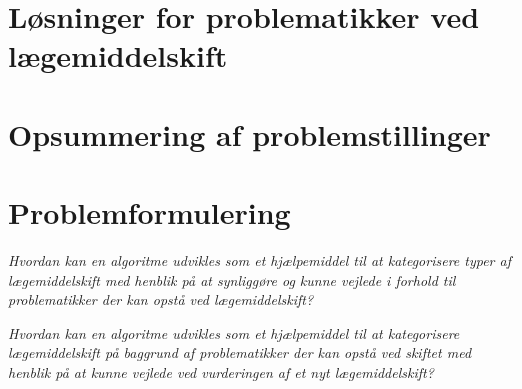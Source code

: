 \section{Løsninger for problematikker ved lægemiddelskift}


%
%

\section{Opsummering af problemstillinger}
\section{Problemformulering}
\textit{Hvordan kan en algoritme udvikles som et hjælpemiddel til at kategorisere typer af lægemiddelskift med henblik på at synliggøre og kunne vejlede i forhold til problematikker der kan opstå ved lægemiddelskift?}

\textit{Hvordan kan en algoritme udvikles som et hjælpemiddel til at kategorisere lægemiddelskift på baggrund af problematikker der kan opstå ved skiftet med henblik på at kunne vejlede ved vurderingen af et nyt lægemiddelskift?} 

